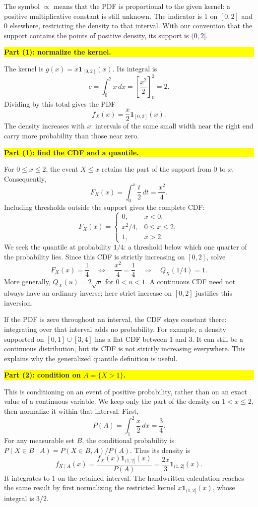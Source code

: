 \documentclass[a4paper,12pt,oneside]{report}
\newcommand{\solutionheading}[1]{%
  \par\Needspace{5\baselineskip}\noindent
  \begingroup\setlength{\fboxsep}{1pt}%
  \colorbox{yellow}{\strut\textbf{#1}}\endgroup\par\nobreak}
\begin{document}
The symbol $\propto$ means that the PDF is proportional to the
given kernel: a positive multiplicative constant is still unknown.
The indicator is $1$ on $[0,2]$ and $0$ elsewhere, restricting the
density to that interval. With our convention that the support
contains the points of positive density, its support is $(0,2]$.

\solutionheading{Part (1): normalize the kernel.}
The kernel is $g(x)=x\mathbf1_{[0,2]}(x)$. Its integral is
\[
  c=\int_0^2 x\,dx
    =\left[\frac{x^2}{2}\right]_0^2=2.
\]
Dividing by this total gives the PDF
\[
  \boxed{f_X(x)=\frac{x}{2}\mathbf1_{[0,2]}(x).}
\]
The density increases with $x$: intervals of the same small width
near the right end carry more probability than those near zero.

\solutionheading{Part (1): find the CDF and a quantile.}
For $0\leq x\leq2$, the event $X\leq x$ retains the part of the
support from $0$ to $x$. Consequently,
\[
  F_X(x)=\int_0^x\frac{t}{2}\,dt=\frac{x^2}{4}.
\]
Including thresholds outside the support gives the complete CDF:
\[
  \boxed{F_X(x)=
  \begin{cases}
    0,&x<0,\\
    x^2/4,&0\leq x\leq2,\\
    1,&x>2.
  \end{cases}}
\]
We seek the quantile at probability $1/4$: a threshold
below which one quarter of the probability lies. Since this CDF
is strictly increasing on $[0,2]$, solve
\[
  F_X(x)=\frac14
  \quad\Longleftrightarrow\quad
  \frac{x^2}{4}=\frac14
  \quad\Longrightarrow\quad
  \boxed{Q_X(1/4)=1.}
\]
More generally, $Q_X(u)=2\sqrt u$ for $0<u<1$.
A continuous CDF need not always have an ordinary inverse; here
strict increase on $[0,2]$ justifies this inversion.

\begin{notebox}
If the PDF is zero throughout an interval, the CDF stays constant
there: integrating over that interval adds no probability.
For example, a density supported on $[0,1]\cup[3,4]$ has a flat
CDF between $1$ and $3$. It can still be a continuous distribution,
but its CDF is not strictly increasing everywhere. This explains
why the generalized quantile definition is useful.
\end{notebox}

\solutionheading{Part (2): condition on $A=\{X>1\}$.}
This is conditioning on an event of positive probability, rather
than on an exact value of a continuous variable. We keep only
the part of the density on $1<x\leq2$, then normalize it within
that interval. First,
\[
  P(A)=\int_1^2\frac{x}{2}\,dx=\frac34.
\]
For any measurable set $B$, the conditional probability is
$P(X\in B\mid A)=P(X\in B, A)/P(A)$. Thus its density is
\[
  \boxed{f_{X\mid A}(x)
    =\frac{f_X(x)\mathbf1_{(1,2]}(x)}{P(A)}
    =\frac{2x}{3}\mathbf1_{(1,2]}(x).}
\]
It integrates to $1$ on the retained interval. The handwritten
calculation reaches the same result by first normalizing the
restricted kernel $x\mathbf1_{(1,2]}(x)$, whose integral is $3/2$.
\end{document}
